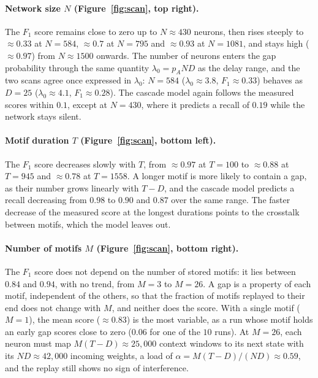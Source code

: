 \documentclass{scrartcl}
\begin{document}
\paragraph{Network size $N$ (Figure~\ref{fig:scan}, top right).}
The $F_1$ score remains close to zero up to $N \approx 430$ neurons, then rises steeply to $\approx 0.33$ at $N = 584$, $\approx 0.7$ at $N = 795$ and $\approx 0.93$ at $N = 1081$, and stays high ($\approx 0.97$) from $N \approx 1500$ onwards. The number of neurons enters the gap probability through the same quantity $\lambda_0 = p_A N D$ as the delay range, and the two scans agree once expressed in $\lambda_0$: $N = 584$ ($\lambda_0 \approx 3.8$, $F_1 \approx 0.33$) behaves as $D = 25$ ($\lambda_0 \approx 4.1$, $F_1 \approx 0.28$). The cascade model again follows the measured scores within $0.1$, except at $N = 430$, where it predicts a recall of $0.19$ while the network stays silent.

\paragraph{Motif duration $T$ (Figure~\ref{fig:scan}, bottom left).}
The $F_1$ score decreases slowly with $T$, from $\approx 0.97$ at $T = 100$ to $\approx 0.88$ at $T = 945$ and $\approx 0.78$ at $T = 1558$. A longer motif is more likely to contain a gap, as their number grows linearly with $T - D$, and the cascade model predicts a recall decreasing from $0.98$ to $0.90$ and $0.87$ over the same range. The faster decrease of the measured score at the longest durations points to the crosstalk between motifs, which the model leaves out.

\paragraph{Number of motifs $M$ (Figure~\ref{fig:scan}, bottom right).}
The $F_1$ score does not depend on the number of stored motifs: it lies between $0.84$ and $0.94$, with no trend, from $M = 3$ to $M = 26$. A gap is a property of each motif, independent of the others, so that the fraction of motifs replayed to their end does not change with $M$, and neither does the score. With a single motif ($M = 1$), the mean score ($\approx 0.83$) is the most variable, as a run whose motif holds an early gap scores close to zero ($0.06$ for one of the $10$ runs). At $M = 26$, each neuron must map $M (T - D) \approx 25{,}000$ context windows to its next state with its $N D \approx 42{,}000$ incoming weights, a load of $\alpha = M(T-D)/(ND) \approx 0.59$, and the replay still shows no sign of interference.
\end{document}
